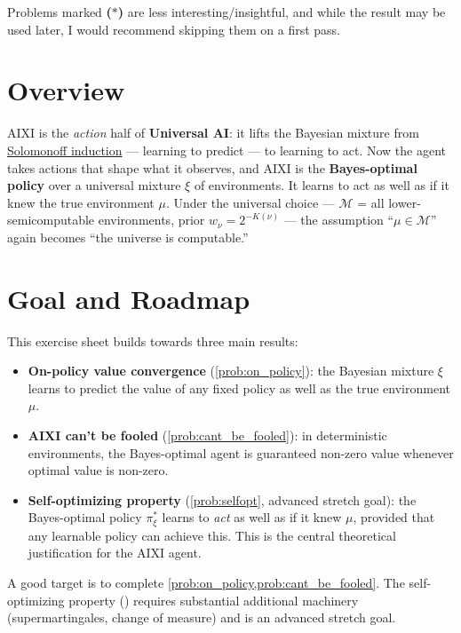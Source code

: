 \documentclass[fontsize=11pt, parskip=half]{scrartcl}
\newcommand{\cM}{\mathcal{M}}
\begin{document}
Problems marked \textbf{($\ast$)} are less interesting/insightful, and while the result may be used later, I would recommend skipping them on a first pass.


\section*{Overview}

AIXI is the \emph{action} half of \textbf{Universal AI}: it lifts the Bayesian
mixture from \href{/agency/solomonoff-induction}{Solomonoff induction} --- learning
to predict --- to learning to act. Now the agent takes actions that shape what it
observes, and AIXI is the \textbf{Bayes-optimal policy} over a universal mixture
$\xi$ of environments. It learns to act as well as if it knew the true environment
$\mu$. Under the universal choice --- $\cM$ = all lower-semicomputable environments,
prior $w_\nu = 2^{-K(\nu)}$ --- the assumption ``$\mu \in \cM$'' again becomes
``the universe is computable.''

\section*{Goal and Roadmap}

This exercise sheet builds towards three main results:
\begin{itemize}\itemsep=2pt
    \item \textbf{On-policy value convergence} (\cref{prob:on_policy}): the Bayesian mixture $\xi$ learns to predict the value of any fixed policy as well as the true environment $\mu$.
    \item \textbf{AIXI can't be fooled} (\cref{prob:cant_be_fooled}): in deterministic environments, the Bayes-optimal agent is guaranteed non-zero value whenever optimal value is non-zero.
    \item \textbf{Self-optimizing property} (\cref{prob:selfopt}, advanced stretch goal): the Bayes-optimal policy $\pi_\xi^*$ learns to \emph{act} as well as if it knew $\mu$, provided that any learnable policy can achieve this. This is the central theoretical justification for the AIXI agent.
\end{itemize}
A good target is to complete \cref{prob:on_policy,prob:cant_be_fooled}. The self-optimizing property () requires substantial additional machinery (supermartingales, change of measure) and is an advanced stretch goal.
\end{document}
